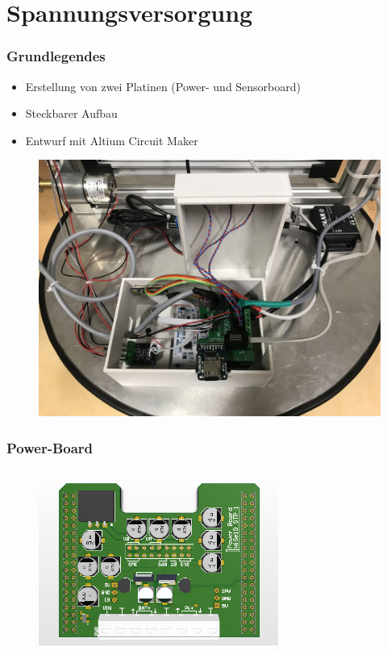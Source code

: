 \documentclass{beamer}
\begin{document}
\section{Spannungsversorgung}
\begin{frame}
\frametitle{Grundlegendes}
\begin{itemize}
    \item Erstellung von zwei Platinen (Power- und Sensorboard)
    \item Steckbarer Aufbau
    \item Entwurf mit Altium Circuit Maker
\end{itemize}
    \begin{figure}[H]
        \centering
        \includegraphics[width=.7\textwidth]{./img/Hauptgehauese.JPG}
    \end{figure}

\end{frame}
\begin{frame}
\frametitle{Power-Board}
\begin{figure}[H]
\centering
\includegraphics[width=0.7\textwidth]{./img/PCB_Power_3D_top.PNG}
\end{figure}
\end{frame}
\end{document}
